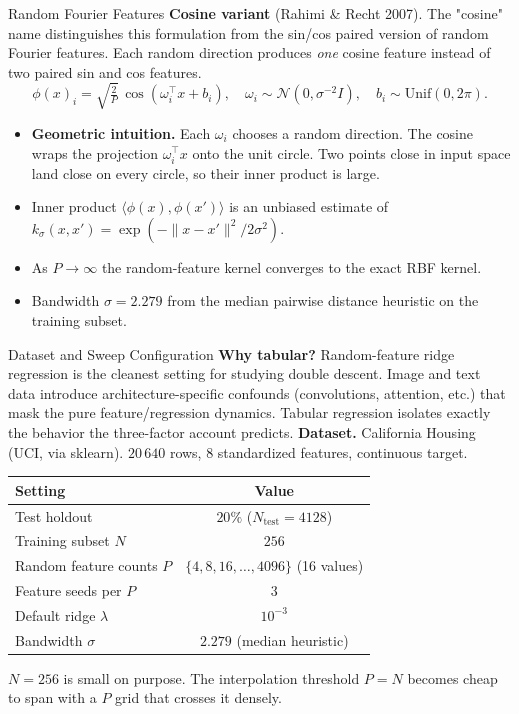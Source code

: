 \documentclass{beamer}
\begin{document}
\begin{frame}{Random Fourier Features}
\textbf{Cosine variant} (Rahimi \& Recht 2007). The "cosine" name distinguishes this formulation from the sin/cos paired version of random Fourier features. Each random direction produces \emph{one} cosine feature instead of two paired sin and cos features.
\begin{equation*}
\phi(x)_i = \sqrt{\tfrac{2}{P}}\, \cos(\omega_i^\top x + b_i),
\quad \omega_i \sim \mathcal{N}(0, \sigma^{-2} I),
\quad b_i \sim \mathrm{Unif}(0, 2\pi).
\end{equation*}
\vfill
\footnotesize
\begin{itemize}\setlength\itemsep{2pt}
  \item \textbf{Geometric intuition.} Each $\omega_i$ chooses a random direction. The cosine wraps the projection $\omega_i^\top x$ onto the unit circle. Two points close in input space land close on every circle, so their inner product is large.
  \item Inner product $\langle \phi(x), \phi(x') \rangle$ is an unbiased estimate of $k_{\sigma}(x, x') = \exp(-\|x - x'\|^2 / 2\sigma^2)$.
  \item As $P \to \infty$ the random-feature kernel converges to the exact RBF kernel.
  \item Bandwidth $\sigma = 2.279$ from the median pairwise distance heuristic on the training subset.
\end{itemize}
\end{frame}

\begin{frame}{Dataset and Sweep Configuration}
\footnotesize
\textbf{Why tabular?} Random-feature ridge regression is the cleanest setting for studying double descent. Image and text data introduce architecture-specific confounds (convolutions, attention, etc.) that mask the pure feature/regression dynamics. Tabular regression isolates exactly the behavior the three-factor account predicts.
\vfill
\textbf{Dataset.} California Housing (UCI, via sklearn). $20\,640$ rows, $8$ standardized features, continuous target.
\vfill
\begin{center}
\begin{tabular}{lc}
\toprule
Setting & Value \\
\midrule
Test holdout & $20\%$ ($N_{\text{test}} = 4128$) \\
Training subset $N$ & $256$ \\
Random feature counts $P$ & $\{4, 8, 16, \dots, 4096\}$ (16 values) \\
Feature seeds per $P$ & $3$ \\
Default ridge $\lambda$ & $10^{-3}$ \\
Bandwidth $\sigma$ & $2.279$ (median heuristic) \\
\bottomrule
\end{tabular}
\end{center}
\vfill
$N = 256$ is small on purpose. The interpolation threshold $P = N$ becomes cheap to span with a $P$ grid that crosses it densely.
\end{frame}
\end{document}
